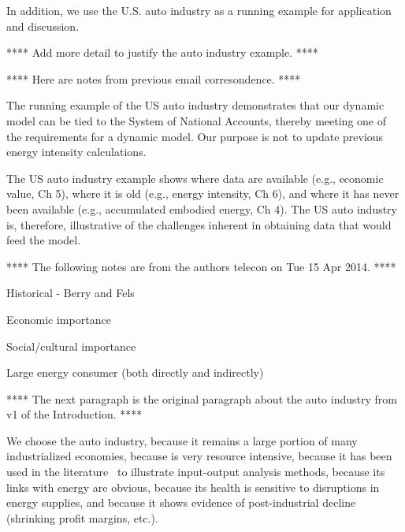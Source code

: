 In addition, we use the U.S. auto industry 
as a running example for application and discussion.

**** Add more detail to justify the auto industry example. **** 

**** Here are notes from previous email corresondence. ****

The running example of the US auto industry demonstrates that our dynamic model 
can be tied to the System of National Accounts, 
thereby meeting one of the requirements for a dynamic model. 
Our purpose is not to update previous energy intensity calculations.

The US auto industry example shows where data are available 
(e.g., economic value, Ch 5), 
where it is old (e.g., energy intensity, Ch 6), 
and where it has never been available (e.g., accumulated embodied energy, Ch 4).  
The US auto industry is, therefore, 
illustrative of the challenges inherent in obtaining data that would feed the model.

**** The following notes are from the authors telecon on Tue 15 Apr 2014. ****

Historical - Berry and Fels

Economic importance

Social/cultural importance

Large energy consumer (both directly and indirectly)

**** The next paragraph is the original paragraph about the auto industry 
from v1 of the Introduction. ****

We choose the auto industry,
because it remains a large portion of many industrialized economies, 
because is very resource intensive,
because it has been used in the literature~\cite{Bullard:1978vd}
to illustrate input-output analysis methods, 
because its links with energy are obvious,
because its health is sensitive to disruptions in energy supplies, and
because it shows evidence of post-industrial decline (shrinking profit margins, etc.).






